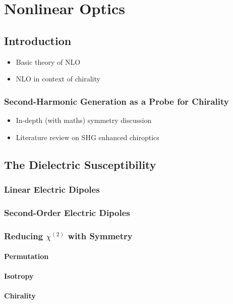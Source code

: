 \chapter{Nonlinear Optics}\label{sec:background:NonlinearOptics}

\section{Introduction}
\begin{itemize}
    \item Basic theory of NLO
    \item NLO in context of chirality
\end{itemize}
\subsection{Second-Harmonic Generation as a Probe for Chirality}\label{sec:background:NonlinearOptics:background}
\begin{itemize}
    \item In-depth (with maths) symmetry discussion
    \item Literature review on SHG enhanced chiroptics
\end{itemize}

\section{The Dielectric Susceptibility}\label{sec:background:NonlinearOptics:susceptibility}
\subsection{Linear Electric Dipoles}
\subsection{Second-Order Electric Dipoles}
\subsection{Reducing \texorpdfstring{$\chi^{(2)}$}{Lg} with Symmetry}\label{sec:background:NonlinearOptics:tensorsymmetry}
\subsubsection{Permutation}\label{sec:background:NonlinearOptics:tensorsymmetry:permutation}
\subsubsection{Isotropy}\label{sec:background:NonlinearOptics:tensorsymmetry:isotropy}
\subsubsection{Chirality}\label{sec:background:NonlinearOptics:tensorsymmetry:chirality}